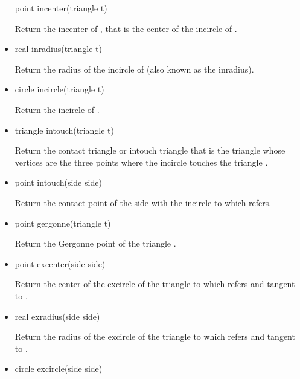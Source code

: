 \documentclass[pdftex]{article}
\begin{document}
\begin{itemize}
  \begin{Vcolor}
    point incenter(triangle t)
  \end{Vcolor}
  Return the incenter of , that is the center of the
  incircle of .
\item {}
  \begin{Vcolor}
    real inradius(triangle t)
  \end{Vcolor}
  Return the radius of the incircle of  (also known as the inradius).
\item {}
  \begin{Vcolor}
    circle incircle(triangle t)
  \end{Vcolor}
  Return the incircle of .
\item {}
  \begin{Vcolor}
    triangle intouch(triangle t)
  \end{Vcolor}
  Return the contact triangle or intouch triangle that is the
  triangle whose vertices are the three points where the incircle
  touches the triangle .
\item {}
  \begin{Vcolor}
    point intouch(side side)
  \end{Vcolor}
  Return the contact point of the side  with the incircle to which 
  refers.
\item {}
  \begin{Vcolor}
    point gergonne(triangle t)
  \end{Vcolor}
  Return the {\sc Gergonne} point of the triangle .
\item {}
  \begin{Vcolor}
    point excenter(side side)
  \end{Vcolor}
  Return the center of the excircle of the triangle to
  which  refers and tangent to .
\item {}
  \begin{Vcolor}
    real exradius(side side)
  \end{Vcolor}
  Return the radius of the excircle of the triangle to
  which  refers and tangent to .
\item {}
  \begin{Vcolor}
    circle excircle(side side)
  \end{Vcolor}

\end{itemize}
\end{document}
